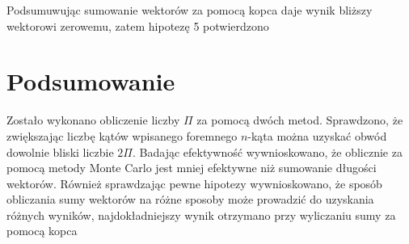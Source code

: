 \documentclass[12pt,a4paper]{article}
\begin{document}
Podsumuwując sumowanie wektorów za pomocą kopca daje wynik bliższy wektorowi zerowemu, zatem hipotezę 5 potwierdzono

\newpage

\section{Podsumowanie}
Zostało wykonano obliczenie liczby $\Pi$ za pomocą dwóch metod. Sprawdzono, że zwiększając liczbę kątów wpisanego foremnego $n$-kąta można uzyskać obwód dowolnie bliski liczbie $2\Pi$. Badając efektywność wywnioskowano, że oblicznie za pomocą metody Monte Carlo jest mniej efektywne niż sumowanie długości wektorów. Również sprawdzając pewne hipotezy wywnioskowano, że sposób obliczania sumy wektorów na różne sposoby może prowadzić do uzyskania różnych wyników, najdokładniejszy wynik otrzymano przy wyliczaniu sumy za pomocą kopca
\end{document}
